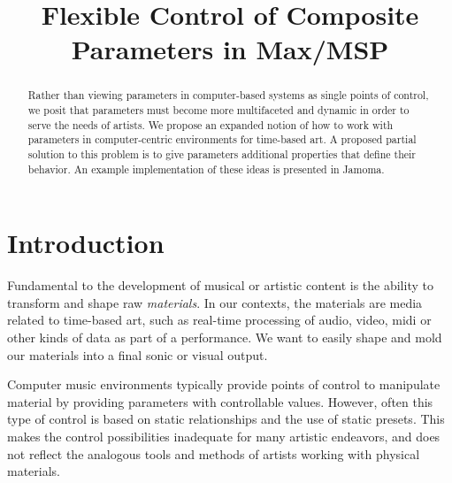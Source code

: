 \documentclass{article}
\title{Flexible Control of Composite Parameters in Max/MSP}
\begin{document}
%
\maketitle
%
\sloppy

\begin{abstract}
Rather than viewing parameters in computer-based systems as single points of control, we posit that parameters must become more multifaceted and dynamic in order to serve the needs of artists. We propose an expanded notion of how to work with parameters in computer-centric environments for time-based art. A proposed partial solution to this problem is to give parameters additional properties that define their behavior. An example implementation of these ideas is presented in Jamoma. 

\end{abstract}


\section{Introduction} %
\label{sec:introduction}

Fundamental to the development of musical or artistic content is the ability to transform and shape raw \emph{materials}. In our contexts, the materials are media related to time-based art, such as real-time processing of audio, video, midi or other kinds of data as part of a performance. We want to easily shape and mold our materials into a final sonic or visual output. 

Computer music environments typically provide points of control to manipulate material by providing parameters with controllable values. However, often this type of control is based on static relationships and the use of static presets. This makes the control possibilities inadequate for many artistic endeavors, and does not reflect the analogous tools and methods of artists working with physical materials.
\end{document}
